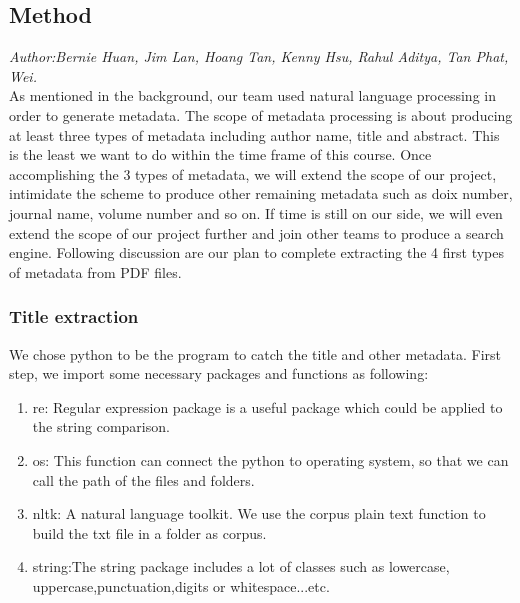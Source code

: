 \subsection{Method} %
\textit{\footnotesize Author:Bernie Huan, Jim Lan, Hoang Tan, Kenny Hsu, Rahul Aditya, Tan Phat, Wei.}\\

As mentioned in the background, our team used natural language processing in order to generate metadata. 
The scope of metadata processing is about producing at least three types of metadata including author name, title and abstract. This is the least we want to do within the time frame of this course. 
Once accomplishing the 3 types of metadata, we will extend the scope of our project, intimidate the scheme to produce other remaining metadata such as doix number, journal name, volume number and so on. 
If time is still on our side, we will even extend the scope of our project further and join other teams to produce a search engine. 
Following discussion are our plan to complete extracting the 4 first types of metadata from PDF files.

\subsubsection{Title extraction}

We chose python to be the program to catch the title and other metadata. 
First step, we import some necessary packages and functions as following:

\begin{enumerate}
	
	\item re: Regular expression package is a useful package which could be applied to the string comparison.
	\item os: This function can connect the python to operating system, so that we can call the path of the files and folders.
	\item nltk: A natural language toolkit.	We use the corpus plain text function to build the txt file in a folder as corpus.
	\item string:The string package includes a lot of classes such as lowercase, uppercase,punctuation,digits or whitespace...etc.
	
\end{enumerate}  

